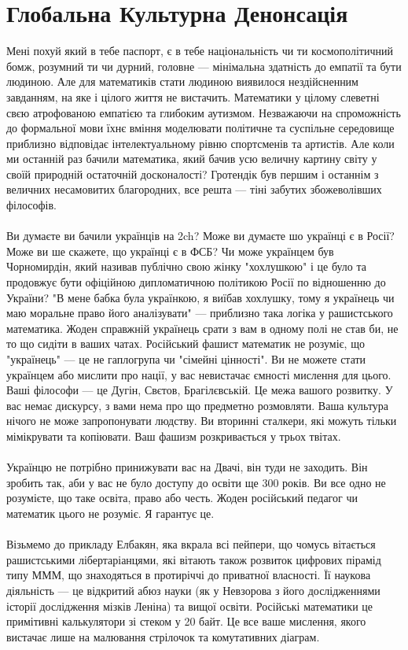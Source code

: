 \section{Глобальна Культурна Денонсація}

Мені похуй який в тебе паспорт, є в тебе національність чи ти космополітичний бомж, розумний ти чи дурний, головне — мінімальна здатність до емпатії та бути людиною. Але для математиків стати людиною виявилося нездійсненним завданням, на яке і цілого життя не вистачить. Математики у цілому слеветні свєю атрофованою емпатією та глибоким аутизмом. Незважаючи на спроможність до формальної мови їхнє вміння моделювати політичне та суспільне середовище приблизно відповідає інтелектуальному рівню спортсменів та артистів. Але коли ми останній раз бачили математика, який бачив усю величну картину світу у своїй природній остаточній досконалості? Гротендік був першим і останнім з величних несамовитих благородних, все решта — тіні забутих збожеволівших філософів.
\\
\\
Ви думаєте ви бачили українців на 2ch? Може ви думаєте шо українці є в Росії? Може ви ше скажете, що українці є в ФСБ? Чи може українцем був Чорномирдін, який називав публічно свою жінку "хохлушкою" і це було та продовжує бути офіційною дипломатичною політикою Росії по відношенню до України? "В мене бабка була українкою, я виїбав хохлушку, тому я українець чи маю моральне право його аналізувати" — приблизно така логіка у рашистського математика. Жоден справжній українець срати з вам в одному полі не став би, не то що сидіти в ваших чатах. Російський фашист математик не розуміє, що "українець" — це не гаплогрупа чи "сімейні цінності". Ви не можете стати українцем або мислити про нації, у вас невистачає ємності мислення для цього. Ваші філософи — це Дугін, Свєтов, Брагілєвській. Це межа вашого розвитку. У вас немає дискурсу, з вами нема про що предметно розмовляти. Ваша культура нічого не може запропонувати людству. Ви вторинні сталкери, які можуть тільки мімікрувати та копіювати. Ваш фашизм розкривається у трьох твітах.
\\
\\
Українцю не потрібно принижувати вас на Двачі, він туди не заходить. Він зробить так, аби у вас не було доступу до освіти ще 300 років. Ви все одно не розумієте, що таке освіта, право або честь. Жоден російський педагог чи математик цього не розуміє. Я гарантує це.
\\
\\
Візьмемо до прикладу Елбакян, яка вкрала всі пейпери, що чомусь вітається рашистськими лібертаріанцями, які вітають також розвиток цифрових пірамід типу МММ, що знаходяться в протиріччі до приватної власності. Її наукова діяльність — це відкритий абюз науки (як у Невзорова з його дослідженнями історії дослідження мізків Леніна) та вищої освіти. Російські математики це примітивні калькулятори зі стеком у 20 байт. Це все ваше мислення, якого вистачає лише на малювання стрілочок та комутативних діаграм.

